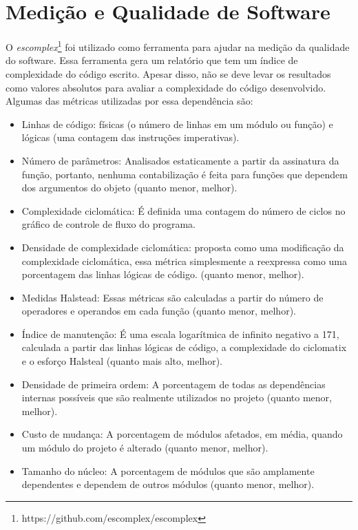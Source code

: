 \documentclass[a4paper, 12pt]{article}
\begin{document}
\section{Medição e Qualidade de Software}

O \textit{escomplex}\footnote{https://github.com/escomplex/escomplex} foi utilizado como ferramenta para ajudar na medição da qualidade do software. Essa ferramenta gera um relatório que tem um índice de complexidade do código escrito. Apesar disso, não se deve levar os resultados como valores absolutos para avaliar a complexidade do código desenvolvido. Algumas das métricas utilizadas por essa dependência são:

\begin{itemize}
    \item Linhas de código: físicas (o número de linhas em um módulo ou função) e lógicas (uma contagem das instruções imperativas).
    
    \item Número de parâmetros: Analisados estaticamente a partir da assinatura da função, portanto, nenhuma contabilização é feita para funções que dependem dos argumentos do objeto (quanto menor, melhor). 

    \item Complexidade ciclomática: É definida uma contagem do número de ciclos no gráfico de controle de fluxo do programa.
    
    \item Densidade de complexidade ciclomática: proposta como uma modificação da complexidade ciclomática, essa métrica simplesmente a reexpressa como uma porcentagem das linhas lógicas de código. (quanto menor, melhor).
    
    \item Medidas Halstead: Essas métricas são calculadas a partir do número de operadores e operandos em cada função (quanto menor, melhor).
    
    \item Índice de manutenção: É uma escala logarítmica de infinito negativo a 171, calculada a partir das linhas lógicas de código, a complexidade do ciclomatix e o esforço Halsteal (quanto mais alto, melhor).
    
    \item Densidade de primeira ordem: A porcentagem de todas as dependências internas possíveis que são realmente utilizados no projeto (quanto menor, melhor).
    
    \item Custo de mudança: A porcentagem de módulos afetados, em média, quando um módulo do projeto é alterado (quanto menor, melhor).
    
    \item Tamanho do núcleo: A porcentagem de módulos que são amplamente dependentes e dependem de outros módulos (quanto menor, melhor).
\end{itemize}
\end{document}
